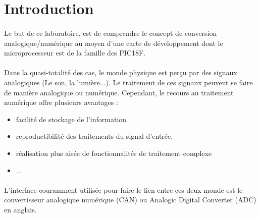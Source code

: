 \section{Introduction}
\paragraph{}
Le but de ce laboratoire, est de comprendre le concept de conversion analogique/numérique au moyen d'une carte de développement dont le microprocesseur est de la famille des PIC18F.
\paragraph{}
Dans la quasi-totalité des cas, le monde physique est perçu par des signaux analogiques (Le son, la lumière...). Le traitement de ces signaux peuvent se faire de manière analogique ou numérique.  Cependant, le recours au traitement numérique offre plusieurs avantages :
\begin{itemize}
\item facilité de stockage de l'information
\item reproductibilité des traitements du signal d'entrée.
\item réalisation plus aisée de fonctionnalités de traitement complexe
\item ...
\end{itemize}
\paragraph{}
L'interface couramment utilisée pour faire le lien entre ces deux monde est le convertisseur analogique numérique (CAN) ou Analogic Digital Converter (ADC) en anglais.
